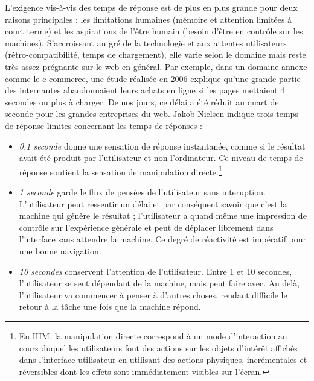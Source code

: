 L'exigence vis-à-vis des temps de réponse est de plus en plus 
grande pour deux raisons principales : les limitations humaines (mémoire et 
attention limitées 
à court terme) et les aspirations de l'être humain (besoin d'être en contrôle sur les 
machines). S'accroissant au gré de la technologie et aux attentes 
utilisateurs (rétro-compatibilité, temps de 
chargement), elle varie selon le domaine mais reste très assez prégnante sur le 
web en général. 
Par exemple, dans un domaine annexe comme le e-commerce, une étude réalisée 
en 2006 explique qu’une grande partie des internautes abandonnaient leurs achats 
en ligne si les pages mettaient 4 secondes ou plus à charger. De nos jours, ce 
délai a été réduit au quart de seconde pour les grandes entreprises du web. Jakob 
Nielsen \cite{Nielsen1993} indique trois temps de réponse limites concernant les 
temps de réponses :
\begin{itemize}
	\item \textit{0,1 seconde} donne une sensation de réponse instantanée, comme 
	si le 
	résultat avait été produit par l'utilisateur et non l'ordinateur. Ce niveau de temps 
	de réponse soutient la sensation de manipulation directe.\footnote{En IHM, la 
		manipulation directe correspond à un mode d'interaction au cours duquel les 
		utilisateurs font des actions sur les objets d'intérêt affichés dans l'interface 
		utilisateur en utilisant des actions physiques, incrémentales et réversibles 
		dont 
		les effets sont immédiatement visibles sur l'écran.} 
	\item \textit{1 seconde} garde le flux de pensées de l'utilisateur sans 
	interuption. 
	L'utilisateur peut ressentir un délai et par conséquent savoir que c'est la 
	machine qui génère le résultat ; l'utilisateur a quand même une impression de 
	contrôle sur l'expérience générale et peut de déplacer librement dans l'interface 
	sans attendre la machine. Ce degré de réactivité est impératif pour une bonne 
	navigation.
	\item \textit{10 secondes} conservent l'attention de l'utilisateur. Entre 1 et 10 
	secondes, l'utilisateur se sent dépendant de la machine, mais peut faire avec. 
	Au delà, l'utilisateur va commencer à penser à d'autres choses, rendant difficile 
	le retour à la tâche une fois que la machine répond.
\end{itemize} 

